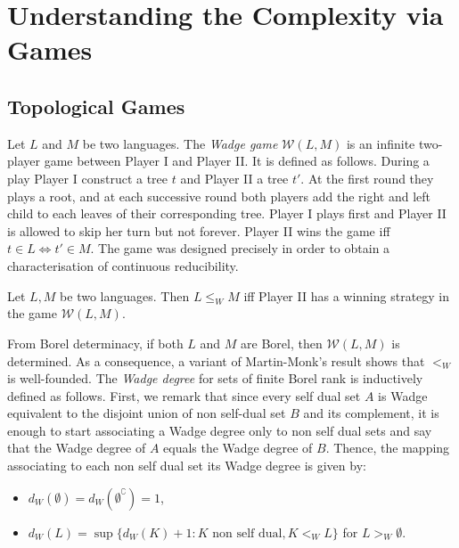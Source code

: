 
\section{Understanding the Complexity via Games}

\subsection{Topological Games}
Let $L$ and $M$ be two languages. The {\em Wadge game}
$\mathcal{W}(L, M)$ is an infinite two-player game between Player I and Player II. It is defined as follows. During a play Player I construct a tree $t$ and Player II a tree $t'$. At the first round they plays a root, and at each successive round  both players add the right and left child to each leaves
of their corresponding tree. Player I plays first and Player II is allowed to
skip her turn but not forever.  Player II wins the game iff $t \in L
\Leftrightarrow t' \in M$.  
The game was designed precisely in order to obtain a characterisation of continuous reducibility.
\begin{lemma}
Let $L, M$ be two languages. Then  $L \leq_W M$ iff Player II has a winning strategy in the game $\mathcal{W}(L, M)$.
\end{lemma}


  From Borel determinacy,
if both $L$ and $M$ are Borel, then $\mathcal{W}(L, M)$ is determined.
As a consequence, a variant of Martin-Monk's result shows that $<_W$ is
well-founded. The \emph{Wadge degree} for sets of finite Borel rank is
inductively defined as follows. First, we remark that since every self dual set $A$ is Wadge equivalent to the disjoint union of non self-dual set $B$ and its complement, it is enough to start associating a Wadge degree only to non self dual sets and say that the Wadge degree of $A$ equals the Wadge degree of $B$. Thence, the mapping associating to each non self dual set its Wadge degree is given by:
\begin{itemize}
\item $d_W(\emptyset)=d_W(\emptyset^\complement)=1$,
\item $d_W(L)=\sup\{d_W(K)+1\colon K \text{ non self dual}, K <_WL\}$ for $L>_W\emptyset$.
\end{itemize}

